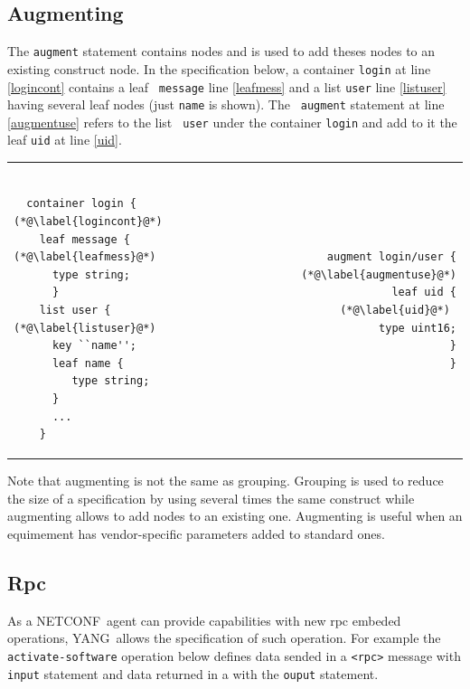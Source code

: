 \documentclass[a4paper]{article}
\newcommand{\nc}{NETCONF}
\newcommand{\y}{YANG}
\begin{document}
\subsection{Augmenting}

The {\tt augment}  statement contains nodes and is  used to add theses
nodes to  an existing  construct node. In  the specification  below, a
container  {\tt login} at  line \ref{logincont}  contains a  leaf {\tt
message} line \ref{leafmess} and a list {\tt user} line \ref{listuser}
having  several leaf  nodes  (just  {\tt name}  is  shown).  The  {\tt
augment} statement  at line \ref{augmentuse}  refers to the  list {\tt
user} under the container {\tt login} and add to it the leaf {\tt uid}
at line \ref{uid}.

\noindent
\begin{tabular}{lr}
\begin{minipage}{.5\textwidth}
\begin{lstlisting}[name=augment]

  container login { (*@\label{logincont}@*)
    leaf message {  (*@\label{leafmess}@*)
      type string;
      }
    list user {      (*@\label{listuser}@*)
      key ``name'';
      leaf name { 
         type string;
      }
      ...
    }
\end{lstlisting}
\end{minipage}
&
\begin{minipage}{.5\textwidth}
\begin{lstlisting}[name=augment]
augment login/user {  (*@\label{augmentuse}@*)
  leaf uid {           (*@\label{uid}@*) 
    type uint16;
  }
}
\end{lstlisting}
\end{minipage}
\end{tabular}

Note that augmenting is not the  same as grouping. Grouping is used to
reduce the  size of  a specification by  using several times  the same
construct  while  augmenting  allows  to  add  nodes  to  an  existing
one.  Augmenting  is useful  when  an  equimement has  vendor-specific
parameters added to standard ones.

\subsection{Rpc}

As  a  \nc\  agent  can  provide capabilities  with  new  rpc  embeded
operations, \y\ allows the specification of such operation. For example
the {\tt  activate-software} operation below defines data  sended in a
{\tt <rpc>} message with {\tt  input} statement and data returned in a
{\tt <rpc-reply>} with the {\tt ouput} statement.
\end{document}
